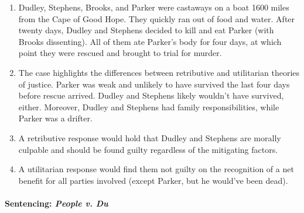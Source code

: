 \begin{enumerate}
    \item Dudley, Stephens, Brooks, and Parker were castaways on a boat 1600 miles from the Cape of Good Hope. They quickly ran out of food and water. After twenty days, Dudley and Stephens decided to kill and eat Parker (with Brooks dissenting). All of them ate Parker's body for four days, at which point they were rescued and brought to trial for murder.
    \item The case highlights the differences between retributive and utilitarian theories of justice. Parker was weak and unlikely to have survived the last four days before rescue arrived. Dudley and Stephens likely wouldn't have survived, either. Moreover, Dudley and Stephens had family responsibilities, while Parker was a drifter.
    \item A retributive response would hold that Dudley and Stephens are morally culpable and should be found guilty regardless of the mitigating factors.
    \item A utilitarian response would find them not guilty on the recognition of a net benefit for all parties involved (except Parker, but he would've been dead).

\end{enumerate}

\paragraph{Sentencing: \emph{People v. Du}}

